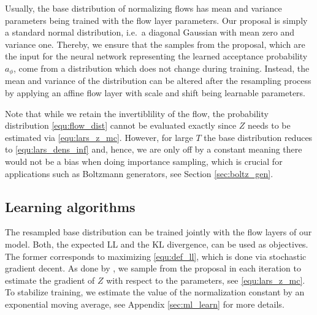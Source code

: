 \documentclass[twoside]{article}
\begin{document}
Usually, the base distribution of normalizing flows has mean and variance parameters being trained with the flow layer parameters. Our proposal is simply a standard normal distribution, i.e.\ a diagonal Gaussian with mean zero and variance one. Thereby, we ensure that the samples from the proposal, which are the input for the neural network representing the learned acceptance probability $a_\phi$, come from a distribution which does not change during training. Instead, the mean and variance of the distribution can be altered after the resampling process by applying an affine flow layer with scale and shift being learnable parameters.

Note that while we retain the invertiblility of the flow, the probability distribution \eqref{equ:flow_dist} cannot be evaluated exactly since $Z$ needs to be estimated via \eqref{equ:lars_z_mc}. However, for large $T$ the base distribution reduces to \eqref{equ:lars_dens_inf} and, hence, we are only off by a constant meaning there would not be a bias when doing importance sampling, which is crucial for applications such as Boltzmann generators, see Section \ref{sec:boltz_gen}.



\subsection{Learning algorithms}
\label{sec:learning_algs}

The resampled base distribution can be trained jointly with the flow layers of our model. Both, the expected LL and the KL divergence, can be used as objectives. The former corresponds to maximizing \eqref{equ:def_ll}, which is done via stochastic gradient decent. As done by \cite{Bauer2019}, we sample from the proposal in each iteration to estimate the gradient of $Z$ with respect to the parameters, see \eqref{equ:lars_z_mc}. To stabilize training, we estimate the value of the normalization constant by an exponential moving average, see Appendix \ref{sec:ml_learn} for more details.
\end{document}
